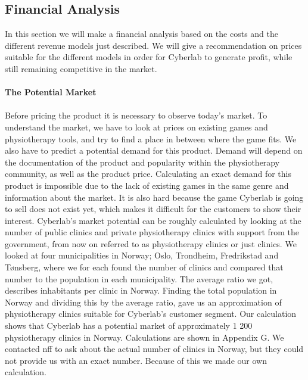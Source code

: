 \subsection{Financial Analysis}
In this section we will make a financial analysis based on the costs and the different revenue models just described. We will give a recommendation on prices suitable for the different models in order for Cyberlab to generate profit, while still remaining competitive in the market. \\ \\
\textbf{The Potential Market} \\ \\
Before pricing the product it is necessary to observe today's market. To understand the market, we have to look at prices on existing games and physiotherapy tools, and try to find a place in between where the game fits. We also have to predict a potential demand for this product. Demand will depend on the documentation of the product and popularity within the physiotherapy community, as well as the product price. Calculating an exact demand for this product is impossible due to the lack of existing games in the same genre and information about the market. It is also hard because the game Cyberlab is going to sell does not exist yet, which makes it difficult for the customers to show their interest. Cyberlab’s market potential can be roughly calculated by looking at the number of public clinics and private physiotherapy clinics with support from the government, from now on referred to as physiotherapy clinics or just clinics. We looked at four municipalities in Norway; Oslo, Trondheim, Fredrikstad and T{ø}nsberg, where we for each found the number of clinics and compared that number to the population in each municipality. The average ratio we got, describes inhabitants per clinic in Norway. Finding the total population in Norway and dividing this by the average ratio, gave us an approximation of physiotherapy clinics suitable for Cyberlab's customer segment. Our calculation shows that Cyberlab has a potential market of approximately 1 200 physiotherapy clinics in Norway. Calculations are shown in Appendix G. We contacted \ac{nff} to ask about the actual number of clinics in Norway, but they could not provide us with an exact number. Because of this we made our own calculation.\\ \\
